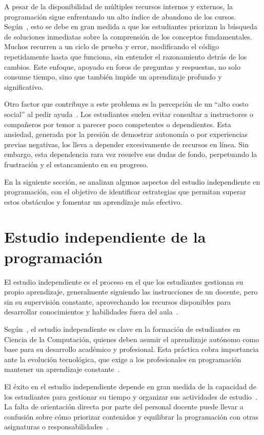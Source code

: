 \documentclass{article}
\begin{document}
A pesar de la disponibilidad de múltiples recursos internos y externos, la programación sigue enfrentando un alto índice de abandono de los cursos. Según~\cite{wong2022}, esto se debe en gran medida a que los estudiantes priorizan la búsqueda de soluciones inmediatas sobre la comprensión de los conceptos fundamentales. Muchos recurren a un ciclo de prueba y error, modificando el código repetidamente hasta que funciona, sin entender el razonamiento detrás de los cambios. Este enfoque, apoyado en foros de preguntas y respuestas, no solo consume tiempo, sino que también impide un aprendizaje profundo y significativo.

Otro factor que contribuye a este problema es la percepción de un ``alto costo social'' al pedir ayuda~\cite{wong2022}. Los estudiantes suelen evitar consultar a instructores o compañeros por temor a parecer poco competentes o dependientes. Esta ansiedad, generada por la presión de demostrar autonomía o por experiencias previas negativas, los lleva a depender excesivamente de recursos en línea. Sin embargo, esta dependencia rara vez resuelve sus dudas de fondo, perpetuando la frustración y el estancamiento en su progreso.

En la siguiente sección, se analizan algunos aspectos del estudio independiente en programación, con el objetivo de identificar estrategias que permitan superar estos obstáculos y fomentar un aprendizaje más efectivo.

\section{Estudio independiente de la programación}\label{sec:study}

El estudio independiente es el proceso en el que los estudiantes gestionan su propio aprendizaje, generalmente siguiendo las instrucciones de un docente, pero sin su supervisión constante, aprovechando los recursos disponibles para desarrollar conocimientos y habilidades fuera del aula~\cite{proskuraLytvynova2020}.

Según~\cite{proskuraLytvynova2020}, el estudio independiente es clave en la formación de estudiantes en Ciencia de la Computación, quienes deben asumir el aprendizaje autónomo como base para su desarrollo académico y profesional. Esta práctica cobra importancia ante la evolución tecnológica, que exige a los profesionales en programación mantener un aprendizaje constante~\cite{proskuraLytvynova2020}.

El éxito en el estudio independiente depende en gran medida de la capacidad de los estudiantes para gestionar su tiempo y organizar sus actividades de estudio~\cite{overklift2019}. La falta de orientación directa por parte del personal docente puede llevar a confusión sobre cómo priorizar contenidos y equilibrar la programación con otras asignaturas o responsabilidades~\cite{proskuraLytvynova2020}. 
\end{document}
